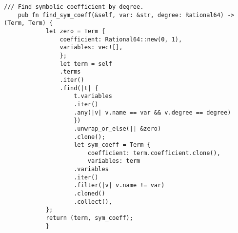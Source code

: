 \begin{lstlisting}[caption={The implementation of the \texttt{find\_sym\_coeff()} method for the \texttt{Polynomial} struct}, label={lst:polynomial-find-sym-coeff}]
    /// Find symbolic coefficient by degree.
    pub fn find_sym_coeff(&self, var: &str, degree: Rational64) -> (Term, Term) {
            let zero = Term {
                coefficient: Rational64::new(0, 1),
                variables: vec![],
                };
                let term = self
                .terms
                .iter()
                .find(|t| {
                    t.variables
                    .iter()
                    .any(|v| v.name == var && v.degree == degree)
                    })
                    .unwrap_or_else(|| &zero)
                    .clone();
                    let sym_coeff = Term {
                        coefficient: term.coefficient.clone(),
                        variables: term
                    .variables
                    .iter()
                    .filter(|v| v.name != var)
                    .cloned()
                    .collect(),
            };
            return (term, sym_coeff);
            }
\end{lstlisting}

